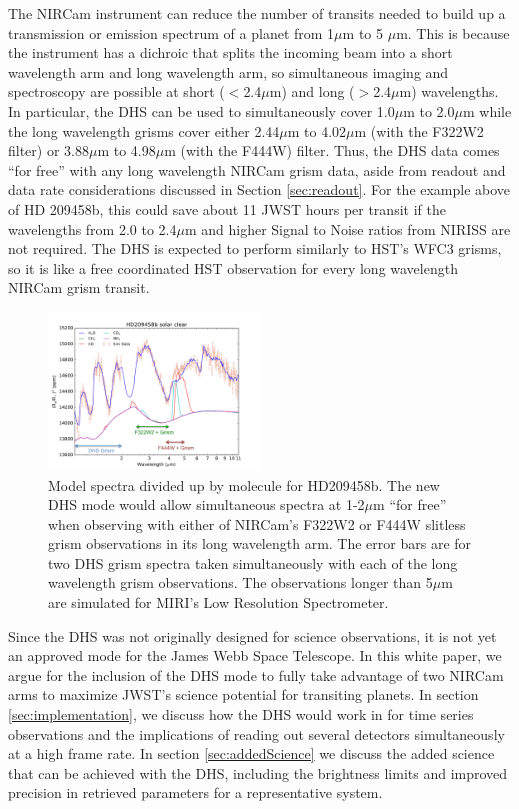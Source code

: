 \documentclass{emulateapj}
\begin{document}
The NIRCam instrument can reduce the number of transits needed to build up a transmission or emission spectrum of a planet from 1$\mu$m to 5 $\mu$m. This is because the instrument has a dichroic that splits the incoming beam into a short wavelength arm and long wavelength arm, so simultaneous imaging and spectroscopy are possible at short ($<$2.4$\mu$m) and long ($>$2.4$\mu$m) wavelengths. In particular, the DHS can be used to simultaneously cover 1.0$\mu$m to 2.0$\mu$m while the long wavelength grisms cover either 2.44$\mu$m to 4.02$\mu$m (with the F322W2 filter) or 3.88$\mu$m to 4.98$\mu$m (with the F444W) filter. Thus, the DHS data comes ``for free'' with any long wavelength NIRCam grism data, aside from readout and data rate considerations discussed in Section \ref{sec:readout}. For the example above of HD 209458b, this could save about 11 JWST hours per transit if the wavelengths from 2.0 to 2.4$\mu$m and higher Signal to Noise ratios from NIRISS are not required. The DHS is expected to perform similarly to HST's WFC3 grisms, so it is like a free coordinated HST observation for every long wavelength NIRCam grism transit.

\begin{figure}[!ht]
\includegraphics[width=0.5\textwidth]{molecules_DHS_HD209.pdf}
\caption{Model spectra divided up by molecule for HD209458b. The new DHS mode would allow simultaneous spectra at 1-2$\mu$m ``for free'' when observing with either of NIRCam's F322W2 or F444W slitless grism observations in its long wavelength arm. The error bars are for two DHS grism spectra taken simultaneously with each of the long wavelength grism observations. The observations longer than 5$\mu$m are simulated for MIRI's Low Resolution Spectrometer.}\label{fig:DHSmolecules}
\end{figure}


Since the DHS was not originally designed for science observations, it is not yet an approved mode for the James Webb Space Telescope. In this white paper, we argue for the inclusion of the DHS mode to fully take advantage of two NIRCam arms to maximize JWST's science potential for transiting planets. In section \ref{sec:implementation}, we discuss how the DHS would work in for time series observations and the implications of reading out several detectors simultaneously at a high frame rate. In section \ref{sec:addedScience} we discuss the added science that can be achieved with the DHS, including the brightness limits and improved precision in retrieved parameters for a representative system.
\end{document}
